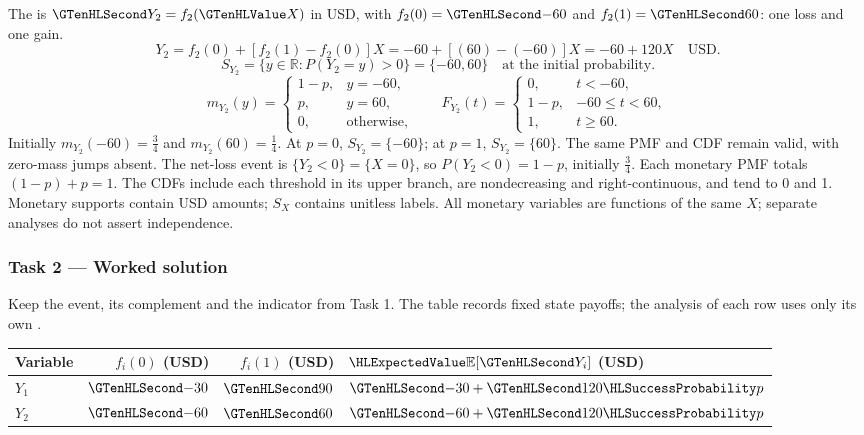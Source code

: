The  is $\Money{Y_2}=f_2(\Indicator{X})$ in USD,
with $f_2(0)=\Money{-60}$ and $f_2(1)=\Money{60}$: one loss and one gain.
\[
Y_2=f_2(0)+[f_2(1)-f_2(0)]X=-60+[(60)-(-60)]X=-60+120X\quad\text{USD}.
\]
\[S_{Y_2}=\{y\in\mathbb R:P(Y_2=y)>0\}=\{-60,60\}\quad\text{at the initial probability}.\]
\[
m_{Y_2}(y)=\begin{cases}1-p,&y=-60,\\p,&y=60,\\0,&\text{otherwise},\end{cases}
\qquad F_{Y_2}(t)=\begin{cases}0,&t<-60,\\1-p,&-60\leq t<60,\\1,&t\geq 60.\end{cases}
\]
Initially $m_{Y_2}(-60)=\frac{3}{4}$ and $m_{Y_2}(60)=\frac{1}{4}$.
At $p=0$, $S_{Y_2}=\{-60\}$; at $p=1$, $S_{Y_2}=\{60\}$.
The same PMF and CDF remain valid, with zero-mass jumps absent.
The net-loss event is $\{Y_2<0\}=\{X=0\}$, so $P(Y_2<0)=1-p$,
initially $\frac{3}{4}$.
Each monetary PMF totals $(1-p)+p=1$. The CDFs include each threshold
in its upper branch, are nondecreasing and right-continuous, and tend to 0 and 1.
Monetary supports contain USD amounts; $S_X$ contains unitless labels.
All monetary variables are functions of the same $X$; separate analyses do not assert independence.
\clearpage\subsubsection*{Task 2 --- Worked solution}\label{sol:c3-energy-decision}
Keep the event, its complement and the indicator from Task 1.
The table records fixed state payoffs; the analysis of each row uses only its own .
\begin{center}\begin{tabular}{lrrl}\toprule
Variable & $f_i(0)$ (USD) & $f_i(1)$ (USD) & $\ExpectedValue{\mathbb E}[\Money{Y_i}]$ (USD)\\\midrule
$Y_1$ & $\Money{-30}$ & $\Money{90}$ & $\Money{-30}+\Money{120}\SuccessProb{p}$\\
$Y_2$ & $\Money{-60}$ & $\Money{60}$ & $\Money{-60}+\Money{120}\SuccessProb{p}$\\
\bottomrule\end{tabular}\end{center}
